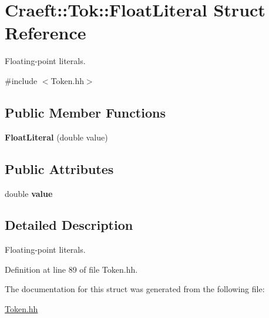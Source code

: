 \hypertarget{struct_craeft_1_1_tok_1_1_float_literal}{}\section{Craeft\+:\+:Tok\+:\+:Float\+Literal Struct Reference}
\label{struct_craeft_1_1_tok_1_1_float_literal}


Floating-\/point literals.  




{\ttfamily \#include $<$Token.\+hh$>$}

\subsection*{Public Member Functions}
\begin{DoxyCompactItemize}
\item 
\hypertarget{struct_craeft_1_1_tok_1_1_float_literal_ab2c97907c6014737f47c8a08929c3ca6}{}\label{struct_craeft_1_1_tok_1_1_float_literal_ab2c97907c6014737f47c8a08929c3ca6} 
{\bfseries Float\+Literal} (double value)
\end{DoxyCompactItemize}
\subsection*{Public Attributes}
\begin{DoxyCompactItemize}
\item 
\hypertarget{struct_craeft_1_1_tok_1_1_float_literal_a702ffc031f709726368dbbda18df9e92}{}\label{struct_craeft_1_1_tok_1_1_float_literal_a702ffc031f709726368dbbda18df9e92} 
double {\bfseries value}
\end{DoxyCompactItemize}


\subsection{Detailed Description}
Floating-\/point literals. 

Definition at line 89 of file Token.\+hh.



The documentation for this struct was generated from the following file\+:\begin{DoxyCompactItemize}
\item 
\hyperlink{_token_8hh}{Token.\+hh}\end{DoxyCompactItemize}
